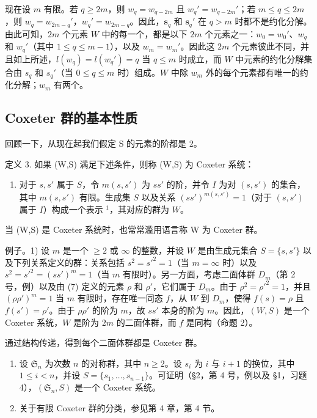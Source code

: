 现在设 \(m\) 有限。若 \(q \geqslant 2m\)，则 \(w_{q} = w_{q - 2m}\) 且 \(w_{q}' = w_{q - 2m}'\)；若 \(m \leqslant q \leqslant 2m\)，则 \(w_{q} = w_{2m - q}'\)，\(w_{q}' = w_{2m - q}\)。因此，\(\mathbf{s}_q\) 和 \(\mathbf{s}_q'\) 在 \(q > m\) 时都不是约化分解。由此可知，\(2m\) 个元素 \(W\) 中的每一个，都是以下 \(2m\) 个元素之一：\(w_0 = w_0'\)、\(w_q\) 和 \(w_q'\)（其中 \(1 \leqslant q \leqslant m - 1\)），以及 \(w_m = w_m'\)。因此这 \(2m\) 个元素彼此不同，并且如上所述，\(l(w_q) = l(w_q') = q\) 当 \(q \leqslant m\) 时成立，而 \(W\) 中元素的约化分解集合由 \(s_q\) 和 \(s_q'\)（当 \(0 \leqslant q \leqslant m\) 时）组成。\(W\) 中除 \(w_m\) 外的每个元素都有唯一的约化分解；\(w_m\) 有两个。

\subsection{Coxeter 群的基本性质}

回顾一下，从现在起我们假定 S 的元素的阶都是 2。

定义 3. 如果 (W,S) 满足下述条件，则称 (W,S) 为 Coxeter 系统：

\begin{enumerate}
\def\labelenumi{(\Alph{enumi})}
\setcounter{enumi}{2}
\tightlist
\item
  对于 \(s, s'\) 属于 \(S\)，令 \(m(s, s')\) 为 \(ss'\) 的阶，并令 \(I\) 为对 \((s, s')\) 的集合，其中 \(m(s, s')\) 有限。生成集 \(S\) 以及关系 \((ss')^{m(s, s')} = 1\)（对于 \((s, s')\) 属于 \(I\)）构成一个表示 \(^{1}\)，其对应的群为 \(W\)。
\end{enumerate}

当 (W,S) 是 Coxeter 系统时，也常常滥用语言称 W 为 Coxeter 群。

例子。1) 设 \(m\) 是一个 \(\geqslant 2\) 或 \(\infty\) 的整数，并设 \(W\) 是由生成元集合 \(S = \{s, s'\}\) 以及下列关系定义的群：关系包括 \(s^2 = s'^2 = 1\)（当 \(m = \infty\) 时）以及 \(s^2 = s'^2 = (ss')^m = 1\)（当 \(m\) 有限时）。另一方面，考虑二面体群 \(D_m\)（第 2 号，例）以及由 (7) 定义的元素 \(\rho\) 和 \(\rho'\)，它们属于 \(D_m\)。由于 \(\rho^2 = \rho'^2 = 1\)，并且 \((\rho \rho')^m = 1\) 当 \(m\) 有限时，存在唯一同态 \(f\)，从 \(W\) 到 \(D_m\)，使得 \(f(s) = \rho\) 且 \(f(s') = \rho'\)。由于 \(\rho \rho'\) 的阶为 \(m\)，故 \(ss'\) 本身的阶为 \(m\)。因此，\((W, S)\) 是一个 Coxeter 系统，\(W\) 是阶为 \(2m\) 的二面体群，而 \(f\) 是同构（命题 2）。

通过结构传递，得到每个二面体群都是 Coxeter 群。

\begin{enumerate}
\def\labelenumi{\arabic{enumi})}
\setcounter{enumi}{1}
\item
  设 \(\mathfrak{S}_n\) 为次数 \(n\) 的对称群，其中 \(n \geqslant 2\)。设 \(s_i\) 为 \(i\) 与 \(i + 1\) 的换位，其中 \(1 \leqslant i < n\)，并设 \(S = \{s_1, \ldots, s_{n-1}\}\)。可证明（§2，第 4 号，例以及 §1，习题 4），\((\mathfrak{S}_n, S)\) 是一个 Coxeter 系统。
\item
  关于有限 Coxeter 群的分类，参见第 4 章，第 4 节。
\end{enumerate}

